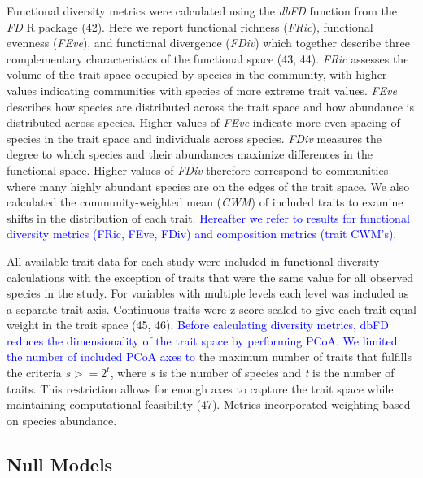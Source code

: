 \documentclass{article}
\begin{document}
Functional diversity metrics were calculated using the \emph{dbFD}
function from the \emph{FD} R package (42). Here we report functional
richness (\emph{FRic}), functional evenness (\emph{FEve}), and
functional divergence (\emph{FDiv}) which together describe three
complementary characteristics of the functional space (43, 44).
\emph{FRic} assesses the volume of the trait space occupied by species
in the community, with higher values indicating communities with species
of more extreme trait values. \emph{FEve} describes how species are
distributed across the trait space and how abundance is distributed
across species. Higher values of \emph{FEve} indicate more even spacing
of species in the trait space and individuals across species.
\emph{FDiv} measures the degree to which species and their abundances
maximize differences in the functional space. Higher values of
\emph{FDiv} therefore correspond to communities where many highly
abundant species are on the edges of the trait space. We also calculated
the community-weighted mean (\emph{CWM}) of included traits to examine
shifts in the distribution of each trait.
\textcolor{blue}{Hereafter we refer to results for functional diversity metrics (FRic, FEve, FDiv) and composition metrics (trait CWM's).}

All available trait data for each study were included in functional
diversity calculations with the exception of traits that were the same
value for all observed species in the study. For variables with multiple
levels each level was included as a separate trait axis. Continuous
traits were z-score scaled to give each trait equal weight in the trait
space (45, 46).
\textcolor{blue}{Before calculating diversity metrics, dbFD reduces the dimensionality of the trait space by performing PCoA. We limited the number of included PCoA axes to}
the maximum number of traits that fulfills the criteria \(s >= 2^t\),
where \(s\) is the number of species and \emph{t} is the number of
traits. This restriction allows for enough axes to capture the trait
space while maintaining computational feasibility (47). Metrics
incorporated weighting based on species abundance.

\hypertarget{null-models}{%
\subsection{Null Models}\label{null-models}}
\end{document}
